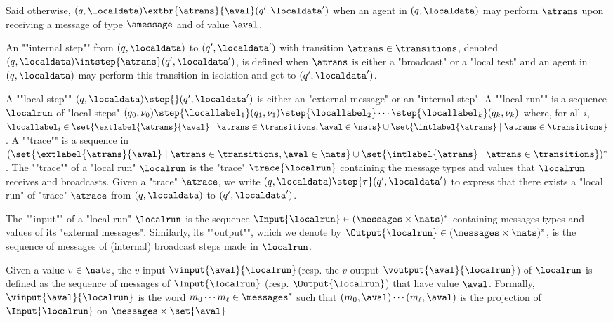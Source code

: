 	Said otherwise, $(q,\localdata) \extbr{\atrans}{\aval} (q',\localdata')$ when an agent in $(q,\localdata)$ may perform $\atrans$ upon receiving a message of type $\amessage$ and of value $\aval$.

	An ""internal step"" from $(q,\localdata)$ to $(q',\localdata')$ with transition $\atrans \in \transitions$, denoted $(q,\localdata) \intstep{\atrans} (q',\localdata')$, is defined when $\atrans$ is either a "broadcast" or a "local test" and an agent in $(q,\localdata)$ may perform this transition in isolation and get to $(q',\localdata')$. 

	A ""local step"" $(q,\localdata) \step{} (q',\localdata')$ is either an "external message" or an "internal step". 
	A ""local run"" is a sequence $\localrun$ of "local steps" $(q_0, \nu_0) \step{\locallabel_1} (q_1, \nu_1) \step{\locallabel_2} \cdots \step{\locallabel_k} (q_k, \nu_k)$ where, for all $i$, $\locallabel_i \in \set{\extlabel{\atrans}{\aval} \mid \atrans \in \transitions, \aval \in \nats} \cup \set{\intlabel{\atrans} \mid \atrans \in \transitions}$. 
	A ""trace"" is a sequence in $(\set{\extlabel{\atrans}{\aval} \mid \atrans \in \transitions, \aval \in \nats} \cup \set{\intlabel{\atrans} \mid \atrans \in \transitions})^*$. The ""trace"" of a "local run" $\localrun$ is the "trace" $\trace{\localrun}$ containing the message types and values that $\localrun$ receives and broadcasts. Given a "trace" $\atrace$, we write $(q,\localdata) \step{\tau} (q',\localdata')$ to express that there exists a "local run" of "trace" $\atrace$ from $(q,\localdata)$ to $(q',\localdata')$. %

	The ""input"" of a "local run" $\localrun$ is the sequence $\Input{\localrun} \in (\messages \times \nats)^*$ containing messages types and values of its "external messages".
	Similarly, its ""output"", which we denote by $\Output{\localrun} \in (\messages \times \nats)^*$, is the sequence of messages of (internal) broadcast steps made in $\localrun$.
	
	Given a value $v \in \nats $, the $v$-input $\vinput{\aval}{\localrun} $(resp. the $v$-output $\voutput{\aval}{\localrun}$) of $\localrun$ is defined as the sequence of messages of $\Input{\localrun}$ (resp. $\Output{\localrun}$) that have value $\aval$. Formally, $\vinput{\aval}{\localrun}$ is the word $m_0 \cdots m_{\ell} \in \messages^*$ such that $(m_0, \aval) \cdots (m_{\ell}, \aval)$ is the projection of $\Input{\localrun}$ on $\messages \times \set{\aval}$. 


